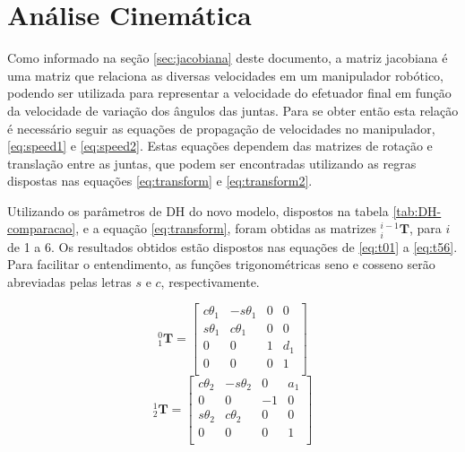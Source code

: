 \section{Análise Cinemática}
\label{sec:analise-cinematica}

Como informado na seção \ref{sec:jacobiana} deste documento, a matriz jacobiana
é uma matriz que relaciona as diversas velocidades em um manipulador 
robótico, podendo ser utilizada para representar a velocidade do efetuador final
em função da velocidade de variação dos ângulos das juntas.
Para se obter então esta relação é necessário seguir as equações de propagação
de velocidades no manipulador, \ref{eq:speed1} e \ref{eq:speed2}.
Estas equações dependem das matrizes de rotação e translação entre as 
juntas, que podem ser encontradas utilizando as regras dispostas nas 
equações \ref{eq:transform} e \ref{eq:transform2}.

Utilizando os parâmetros de DH do novo modelo, dispostos na tabela \ref{tab:DH-comparacao},
e a equação \ref{eq:transform}, foram obtidas as matrizes $^{i-1}_i\textbf{T}$, para $i$ de 1 a 6. 
Os resultados obtidos estão dispostos nas equações de \ref{eq:t01} a \ref{eq:t56}.
Para facilitar o entendimento, as funções trigonométricas seno e cosseno serão abreviadas pelas
letras $s$ e $c$, respectivamente.

\begin{multicols}{2}
    \noindent
    \begin{equation}
        \label{eq:t01}
        ^0_1\textbf{T} = \begin{bmatrix}
                    c\theta_1 & -s\theta_1 & 0 & 0 \\
                    s\theta_1 & c\theta_1 & 0 & 0 \\
                    0 & 0 & 1 & d_1 \\
                    0 & 0 & 0 & 1 \\
                \end{bmatrix}
    \end{equation}
    \begin{equation}
        ^1_2\textbf{T} = \begin{bmatrix}
                    c\theta_2 & -s\theta_2 & 0 & a_1 \\
                    0 & 0 & -1 & 0 \\
                    s\theta_2 & c\theta_2 & 0 & 0 \\
                    0 & 0 & 0 & 1 \\
                \end{bmatrix}
    \end{equation}
\end{multicols}

